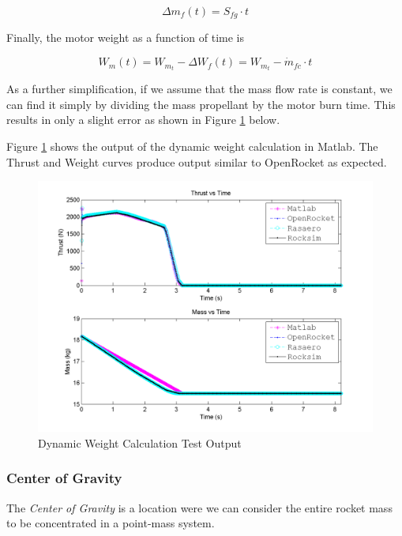 \documentclass[]{article}
\begin{document}
\begin{equation}
\Delta m_f(t) = S_{fg} \cdot t
\end{equation}

Finally, the motor weight as a function of time is

\begin{equation}
W_m (t) = W_{m_t} - \Delta W_f(t) = W_{m_t} - \dot{m}_{fc} \cdot t
\end{equation}

As a further simplification, if we assume that the mass flow rate is
constant, we can find it simply by dividing the mass propellant by the
motor burn time. This results in only a slight error as shown in Figure
\ref{dynamic_weight_calculation_test_figure_label} below.

Figure \ref{dynamic_weight_calculation_test_figure_label} shows the
output of the dynamic weight calculation in Matlab. The Thrust and
Weight curves produce output similar to OpenRocket as expected.

\begin{figure}[htbp]
\centering
\includegraphics{images/plots/error_thrust_mass.png}
\caption{Dynamic Weight Calculation Test Output
\label{dynamic_weight_calculation_test_figure_label}}
\end{figure}

\subsubsection{Center of Gravity}\label{center-of-gravity}

The \emph{Center of Gravity} is a location were we can consider the
entire rocket mass to be concentrated in a point-mass system.
\end{document}
